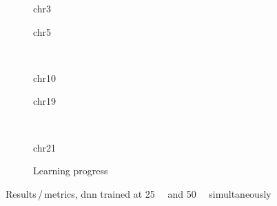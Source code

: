 \begin{figure}[p]%
    \begin{subfigure}{0.45\textwidth}
        \scriptsize 
        \caption{chr3}
    \end{subfigure} \hfill
    \begin{subfigure}{0.45\textwidth}
        \scriptsize
        \caption{chr5}
    \end{subfigure}\\[5mm]
    \begin{subfigure}{0.45\textwidth}
        \scriptsize
        \caption{chr10}
    \end{subfigure}\hfill
    \begin{subfigure}{0.45\textwidth}
        \scriptsize
        \caption{chr19}
    \end{subfigure}\\[3mm]
    \begin{subfigure}{0.45\textwidth}
        \scriptsize
        \caption{chr21} \label{fig:results:DNN_25_pearson_21}
    \end{subfigure}\hfill
    \begin{subfigure}{0.45\textwidth}
        \caption{Learning progress} \label{fig:results:25plus50_lossEpochs}
    \end{subfigure}
    \caption{Results\,/\,metrics, \acrshort{dnn} trained at \SI{25}{\kilo\bp} and \SI{50}{\kilo\bp} simultaneously} \label{fig:results:DNN25plus50_pearson}
\end{figure}
